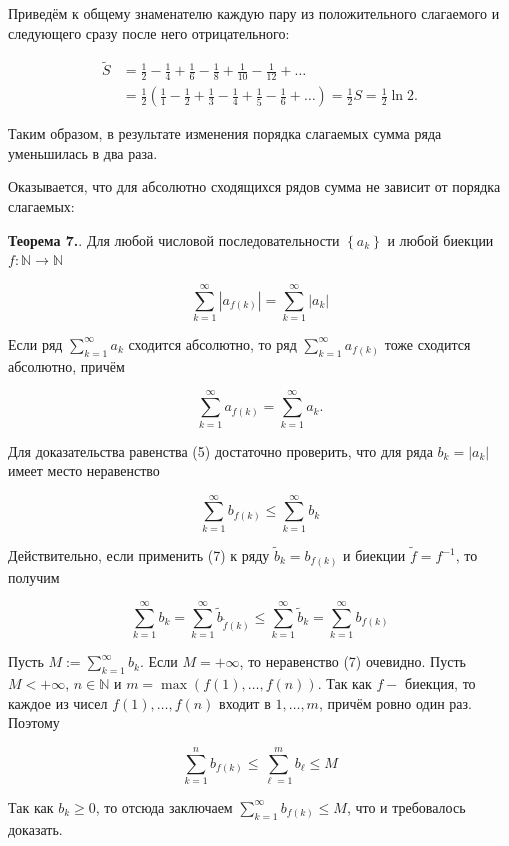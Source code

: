 \documentclass[a4paper,12pt]{article} %
\begin{document}
	Приведём к общему знаменателю каждую пару из положительного слагаемого и следующего сразу после него отрицательного:
	
	$$
	\begin{aligned}
	\tilde{S} & =\frac{1}{2}-\frac{1}{4}+\frac{1}{6}-\frac{1}{8}+\frac{1}{10}-\frac{1}{12}+\ldots \\
	& =\frac{1}{2}\left(\frac{1}{1}-\frac{1}{2}+\frac{1}{3}-\frac{1}{4}+\frac{1}{5}-\frac{1}{6}+\ldots\right)=\frac{1}{2} S=\frac{1}{2} \ln 2 .
	\end{aligned}
	$$
	
	Таким образом, в результате изменения порядка слагаемых сумма ряда уменьшилась в два раза.
	
	Оказывается, что для абсолютно сходящихся рядов сумма не зависит от порядка слагаемых:
	
	\textbf{Теорема 7.}. Для любой числовой последовательности $\left\{a_{k}\right\}$ и любой биекции $f: \mathbb{N} \rightarrow \mathbb{N}$
	
	$$
	\sum_{k=1}^{\infty}\left|a_{f(k)}\right|=\sum_{k=1}^{\infty}\left|a_{k}\right|
	$$
	
	Если ряд $\sum_{k=1}^{\infty} a_{k}$ сходится абсолютно, то ряд $\sum_{k=1}^{\infty} a_{f(k)}$ тоже сходится абсолютно, причём
	
	$$
	\sum_{k=1}^{\infty} a_{f(k)}=\sum_{k=1}^{\infty} a_{k} .
	$$
	
	Для доказательства равенства (5) достаточно проверить, что для ряда $b_{k}=\left|a_{k}\right|$ имеет место неравенство
	
	$$
	\sum_{k=1}^{\infty} b_{f(k)} \leq \sum_{k=1}^{\infty} b_{k}
	$$
	
	Действительно, если применить (7) к ряду $\tilde{b}_{k}=b_{f(k)}$ и биекции $\tilde{f}=f^{-1}$, то получим
	
	$$
	\sum_{k=1}^{\infty} b_{k}=\sum_{k=1}^{\infty} \tilde{b}_{\tilde{f}(k)} \leq \sum_{k=1}^{\infty} \tilde{b}_{k}=\sum_{k=1}^{\infty} b_{f(k)}
	$$
	
	Пусть $M:=\sum_{k=1}^{\infty} b_{k}$. Если $M=+\infty$, то неравенство (7) очевидно. Пусть $M<+\infty$, $n \in \mathbb{N}$ и $m=\max (f(1), \ldots, f(n))$. Так как $f-$ биекция, то каждое из чисел $f(1), \ldots, f(n)$ входит в $1, \ldots, m$, причём ровно один раз. Поэтому
	
	$$
	\sum_{k=1}^{n} b_{f(k)} \leq \sum_{\ell=1}^{m} b_{\ell} \leq M
	$$
	
	Так как $b_{k} \geq 0$, то отсюда заключаем $\sum_{k=1}^{\infty} b_{f(k)} \leq M$, что и требовалось доказать.
	
\end{document}
